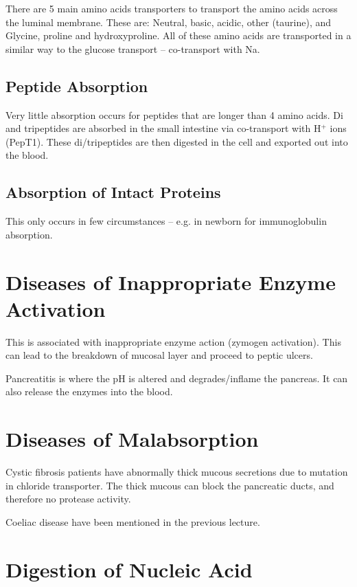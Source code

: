 \documentclass[a4paper, 12pt]{report}
\begin{document}
There are 5 main amino acids transporters to transport the amino acids across the luminal membrane.
These are: Neutral, basic, acidic, other (taurine), and Glycine, proline and hydroxyproline.
All of these amino acids are transported in a similar way to the glucose transport -- co-transport with Na.

\subsection{Peptide Absorption}

Very little absorption occurs for peptides that are longer than 4 amino acids.
Di and tripeptides are absorbed in the small intestine via co-transport with H$^+$ ions (PepT1).
These di/tripeptides are then digested in the cell and exported out into the blood.

\subsection{Absorption of Intact Proteins}

This only occurs in few circumstances -- e.g. in newborn for immunoglobulin absorption.

\section{Diseases of Inappropriate Enzyme Activation}

This is associated with inappropriate enzyme action (zymogen activation).
This can lead to the breakdown of mucosal layer and proceed to peptic ulcers.

Pancreatitis is where the pH is altered and degrades/inflame the pancreas.
It can also release the enzymes into the blood.

\section{Diseases of Malabsorption}

Cystic fibrosis patients have abnormally thick mucous secretions due to mutation in chloride transporter.
The thick mucous can block the pancreatic ducts, and therefore no protease activity.

Coeliac disease have been mentioned in the previous lecture.

\section{Digestion of Nucleic Acid}
\end{document}
